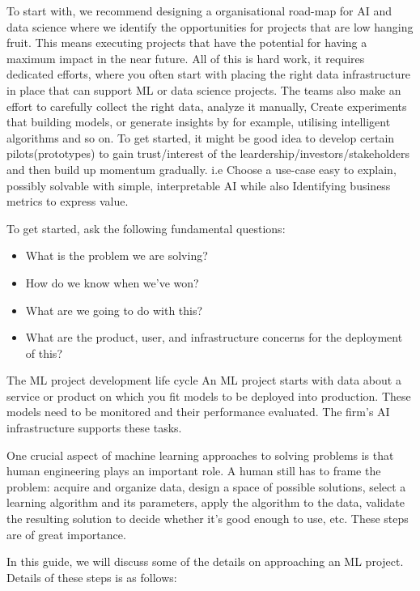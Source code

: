\documentclass[openany]{book}
\begin{document}
To start with, we recommend designing a organisational road-map for AI and data science where we identify the opportunities for projects that are low hanging fruit. This means executing projects that have the potential for having a maximum impact in the near future.  All of this is hard work, it requires  dedicated efforts, where you often start with placing the right data infrastructure in place that can support ML or data science projects. The teams also make an effort to carefully collect the right data, analyze it manually, Create experiments that building models, or generate insights by for example, utilising intelligent algorithms and so on.  To get started, it might be good idea to develop certain pilots(prototypes) to gain trust/interest of the leardership/investors/stakeholders and then build up momentum gradually. i.e Choose a use-case easy to explain, possibly solvable with simple, interpretable AI while also Identifying business metrics to express value. 

To get started, ask the following fundamental questions: 

\begin{itemize}
    \item What is the problem we are solving?
    \item How do we know when we've won?
    \item What are we going to do with this?
    \item What are the product, user, and infrastructure concerns for the deployment of this?
\end{itemize}



The ML project development life cycle An ML project starts with data about a service or product on which you fit models to be deployed into production. These models need to be monitored and their performance evaluated. The firm’s AI infrastructure supports these tasks.

One crucial aspect of machine learning approaches to solving problems is that human engineering plays an important role. A human still has to frame the problem: acquire and organize data, design a space of possible solutions, select a learning algorithm and its parameters, apply the algorithm to the data, validate the resulting solution to decide whether it's good enough to use, etc. These steps are of great importance.

In this guide, we will discuss some of the details on approaching an ML project. Details of these steps is as follows: 
\end{document}
